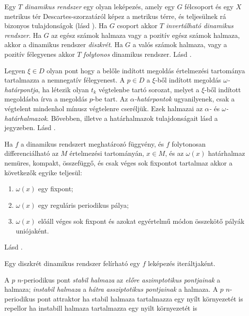 \documentclass[%
	DIV=15,appendixprefix]{scrreprt}
\theoremstyle{definition}
\theoremstyle{remark}
\begin{document}
Egy $ T $ \emph{dinamikus rendszer} egy olyan leképezés, amely egy $ G $ félcsoport és egy $ X $
metrikus tér Descartes-szorzatáról képez a metrikus térre, és teljesülnek rá bizonyos tulajdonságok
(lásd \cite[18.~oldal]{Makay}). Ha $ G $ csoport akkor $ T $ \emph{invertálható dinamikus rendszer}.
Ha $ G $ az egész számok halmaza vagy a pozitív egész számok halmaza, akkor a dinamikus rendszer
\emph{diszkrét}. Ha $ G $ a valós számok halmaza, vagy a pozitív félegyenes akkor $ T $
\emph{folytonos} dinamikus rendszer.
%
Lásd \cite[4.~oldal]{Makay}.

Legyen $ \xi \in D $ olyan pont hogy a belőle indított megoldás értelmezési tartománya tartalmazza
a nemnegatív félegyenest. A $ p \in D $ a $ \xi $-ből indított megoldás
\emph{$\omega$-határpontja}, ha létezik olyan $ t_k $ végtelenbe tartó sorozat, melyet a $ \xi$-ből
indított megoldásba írva a megoldás $ p $-be tart. Az \emph{$\alpha$-határpontok} ugyanilyenek, csak
a végtelent mindenhol mínusz végtelenre cseréljük. Ezek halmazai az \emph{$\alpha$-} és
\emph{$\omega$-határhalmazok}. Bővebben, illetve a határhalmazok tulajdonságait lásd a jegyzeben.
%
Lásd \cite[40.~oldal]{Makay}.

Ha $ f $ a dinamikus rendszert meghatározó függvény, és $f$ folytonosan differenciálható az $M$
értelmezési tartományán, $ x\in M $, és az $\omega \left( x \right) $ határhalmaz
nemüres, kompakt, összefüggő, és csak véges sok fixpontot tartalmaz akkor a következők egyike
teljesül:
\begin{enumerate}
	\item $\omega \left( x \right) $ egy fixpont;
	\item $\omega \left( x \right) $ egy reguláris periodikus pálya;
	\item $\omega \left( x \right) $ előáll véges sok fixpont és azokat egyértelmű módon összekötő
		pályák uniójaként.
\end{enumerate}
%
Lásd \cite[18--21.~oldal]{Makay}.

Egy diszkrét dinamikus rendszer felírható egy $ f $ leképezés iteráltjaként.

A $p$ $n$-periodikus pont \emph{stabil halmaza} az \emph{előre aszimptotikus pontjainak} a halmaza;
\emph{instabil halmaza} a \emph{hátra assziptotikus pontjainak} a halmaza. A $ p $ $n$-periodikus
pont attraktor ha stabil halmaza tartalmazza egy nyílt környezetét is
repellor ha instabill halmaza tartalmazza egy nyilt környezetét is
\end{document}
